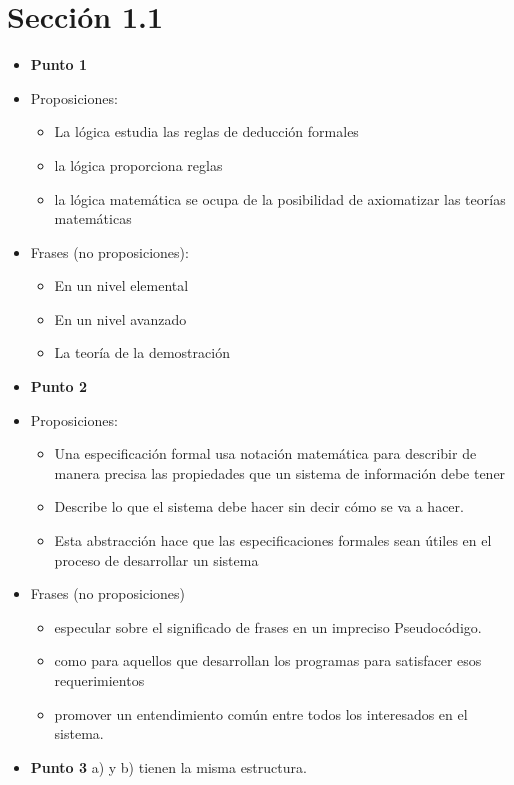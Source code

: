 \documentclass{article}
\begin{document}
\section{Sección 1.1}
\begin{itemize}
	\item \textbf{Punto 1}
	\item[] Proposiciones:
		\begin{itemize}
			\item La lógica estudia las reglas de deducción formales
			\item la lógica proporciona reglas
			\item la lógica matemática se ocupa de la posibilidad de axiomatizar las teorías matemáticas
		\end{itemize}
	\item Frases (no proposiciones):
	      \begin{itemize}
		      \item En un nivel elemental
		      \item En un nivel avanzado
		      \item La teoría de la demostración
	      \end{itemize}
	\item \textbf{Punto 2}
	\item[] Proposiciones:
		\begin{itemize}
			\item Una especiﬁcación formal usa notación matemática para describir de manera precisa las propiedades que un sistema de información debe tener
			\item Describe lo que el sistema debe hacer sin decir cómo se va a hacer.
			\item Esta abstracción hace que las especiﬁcaciones formales sean útiles en el proceso de desarrollar un sistema
		\end{itemize}
	\item[] Frases (no proposiciones)
		\begin{itemize}
			\item especular sobre el signiﬁcado de frases en un impreciso Pseudocódigo.
			\item como para aquellos que desarrollan los programas para satisfacer esos requerimientos
			\item promover un entendimiento común entre todos los interesados en el sistema.
		\end{itemize}
	\item \textbf{Punto 3}
	      a) y b) tienen la misma estructura.
\end{itemize}
\end{document}
